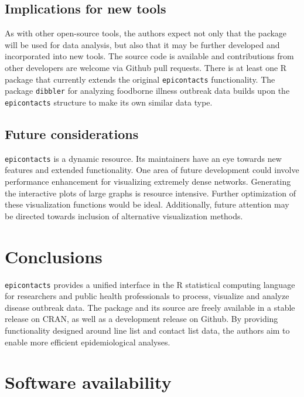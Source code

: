 \documentclass[9pt,a4paper,]{extarticle}
\theoremstyle{definition}
\theoremstyle{definition}
\theoremstyle{definition}
\theoremstyle{remark}
\begin{document}
\subsection{Implications for new tools}\label{implications-for-new-tools}

As with other open-source tools, the authors expect not only that the package will be used for data analysis, but also that it may be further developed and incorporated into new tools. The source code is available and contributions from other developers are welcome via Github pull requests. There is at least one R package that currently extends the original \texttt{epicontacts} functionality. The package \texttt{dibbler} for analyzing foodborne illness outbreak data builds upon the \texttt{epicontacts} structure to make its own similar data type\citep{dibbler}.

\subsection{Future considerations}\label{future-considerations}

\texttt{epicontacts} is a dynamic resource. Its maintainers have an eye towards new features and extended functionality. One area of future development could involve performance enhancement for visualizing extremely dense networks. Generating the interactive plots of large graphs is resource intensive. Further optimization of these visualization functions would be ideal. Additionally, future attention may be directed towards inclusion of alternative visualization methods.

\section{Conclusions}\label{conclusions}

\texttt{epicontacts} provides a unified interface in the R statistical computing language for researchers and public health professionals to process, visualize and analyze disease outbreak data. The package and its source are freely available in a stable release on CRAN, as well as a development release on Github. By providing functionality designed around line list and contact list data, the authors aim to enable more efficient epidemiological analyses.

\section{Software availability}\label{software-availability}
\end{document}
